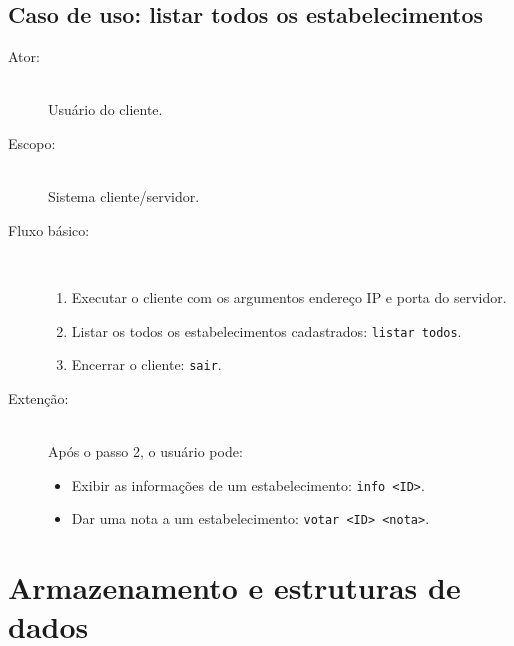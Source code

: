 \documentclass[a4paper,10pt,oneside,final,titlepage,onecolumn]{scrartcl}
\begin{document}
\subsection{Caso de uso: listar todos os estabelecimentos}
\begin{description}
 \item[Ator:] \hfill \\ Usuário do cliente.
 \item[Escopo:] \hfill \\ Sistema cliente/servidor.
 \item[Fluxo básico:] \hfill \\
 \begin{enumerate}
  \item Executar o cliente com os argumentos endereço IP e porta do servidor.
  \item Listar os todos os estabelecimentos cadastrados: \verb|listar todos|.
  \item Encerrar o cliente: \verb|sair|.
 \end{enumerate}
 \item[Extenção:] \hfill \\ Após o passo 2, o usuário pode:
 \begin{itemize}
  \item Exibir as informações de um estabelecimento: \verb|info <ID>|.
  \item Dar uma nota a um estabelecimento: \verb|votar <ID> <nota>|.
 \end{itemize}
\end{description}



\FloatBarrier

\section{Armazenamento e estruturas de dados}
\end{document}
